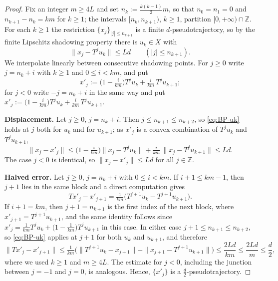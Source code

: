 \documentclass[12pt]{article}
\newcommand{\Zz}{\mathbb{Z}}
\theoremstyle{definition}
\begin{document}
\begin{proof}
Fix an integer $m \ge 4L$ and set
$
n_k := \frac{k(k-1)}{2}m
$,
so that $n_0 = n_1 = 0$ and $n_{k+1} - n_k = km$ for $k \ge 1$; the intervals $[n_k, n_{k+1})$, $k \ge 1$, partition $[0, +\infty) \cap \Zz$. For each $k \ge 1$ the restriction $\{x_j\}_{|j| \le n_{k+1}}$ is a finite $d$-pseudotrajectory, so by the finite Lipschitz shadowing property there is $u_k \in X$ with
\begin{equation}\label{eq:BP-uk}
\|x_j - T^j u_k\| \le Ld \qquad (|j| \le n_{k+1}).
\end{equation}
We interpolate linearly between consecutive shadowing points. For $j \ge 0$ write $j = n_k + i$ with $k \ge 1$ and $0 \le i < km$, and put
$$
x'_j := \Big(1 - \tfrac{i}{km}\Big) T^j u_k + \tfrac{i}{km}\, T^j u_{k+1};
$$
for $j < 0$ write $-j = n_k + i$ in the same way and put $x'_j := \big(1 - \tfrac{i}{km}\big) T^j u_k + \tfrac{i}{km}\, T^j u_{k+1}$.

\textbf{Displacement.} Let $j \ge 0$, $j = n_k + i$. Then $j \le n_{k+1} \le n_{k+2}$, so \eqref{eq:BP-uk} holds at $j$ both for $u_k$ and for $u_{k+1}$; as $x'_j$ is a convex combination of $T^j u_k$ and $T^j u_{k+1}$,
$$
\|x_j - x'_j\| \le \Big(1-\tfrac{i}{km}\Big)\|x_j - T^j u_k\| + \tfrac{i}{km}\,\|x_j - T^j u_{k+1}\| \le Ld.
$$
The case $j<0$ is identical, so $\|x_j - x'_j\| \le Ld$ for all $j \in \Zz$.

\textbf{Halved error.} Let $j \ge 0$, $j = n_k + i$ with $0 \le i < km$. If $i+1 \le km-1$, then $j+1$ lies in the same block and a direct computation gives
$$
Tx'_j - x'_{j+1} = \tfrac{1}{km}\big(T^{j+1}u_k - T^{j+1}u_{k+1}\big).
$$
If $i+1 = km$, then $j+1 = n_{k+1}$ is the first index of the next block, where $x'_{j+1} = T^{j+1}u_{k+1}$, and the same identity follows since $x'_j = \tfrac{1}{km}T^{j}u_k + \big(1-\tfrac{1}{km}\big)T^{j}u_{k+1}$ in this case. In either case $j+1 \le n_{k+1} \le n_{k+2}$, so \eqref{eq:BP-uk} applies at $j+1$ for both $u_k$ and $u_{k+1}$, and therefore
$$
\|Tx'_j - x'_{j+1}\| \le \tfrac{1}{km}\Big(\|T^{j+1}u_k - x_{j+1}\| + \|x_{j+1} - T^{j+1}u_{k+1}\|\Big) \le \frac{2Ld}{km} \le \frac{2Ld}{m} \le \frac{d}{2},
$$
where we used $k \ge 1$ and $m \ge 4L$. The estimate for $j < 0$, including the junction between $j=-1$ and $j=0$, is analogous. Hence, $\{x'_j\}$ is a $\tfrac{d}{2}$-pseudotrajectory.
\end{proof}
\end{document}
